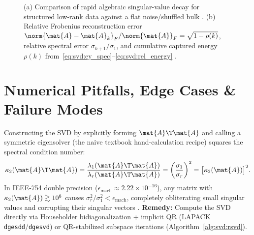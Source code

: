 \documentclass[../../../../master.tex]{subfiles}
\begin{document}
\begin{figure}[htbp]
\caption{(a) Comparison of rapid algebraic singular-value decay for structured low-rank data against a flat noise/shuffled bulk . (b) Relative Frobenius reconstruction error $\norm{\mat{A}-\mat{A}_k}_F/\norm{\mat{A}}_F = \sqrt{1-\rho(k)}$, relative spectral error $\sigma_{k+1}/\sigma_1$, and cumulative captured energy $\rho(k)$ from~\eqref{eq:svd:ey_spec}--\eqref{eq:svd:rel_energy} .}
\label{fig:svd:spectrum_error}
\end{figure}


\section{Numerical Pitfalls, Edge Cases \& Failure Modes}
\label{sec:svd:pitfalls}

\begin{pitfall}
Constructing the SVD by explicitly forming $\mat{A}\T\mat{A}$ and calling a symmetric eigensolver (the naive textbook hand-calculation recipe) squares the spectral condition number:
\[
  \kappa_2(\mat{A}\T\mat{A}) = \frac{\lambda_1(\mat{A}\T\mat{A})}{\lambda_r(\mat{A}\T\mat{A})} = \left(\frac{\sigma_1}{\sigma_r}\right)^2 = \bigl[\kappa_2(\mat{A})\bigr]^2.
\]
In IEEE-754 double precision ($\epsilon_{\text{mach}} \approx 2.22 \times 10^{-16}$), any matrix with $\kappa_2(\mat{A}) \gtrsim 10^8$ causes $\sigma_r^2/\sigma_1^2 < \epsilon_{\text{mach}}$, completely obliterating small singular values and corrupting their singular vectors  . \textbf{Remedy:} Compute the SVD directly via Householder bidiagonalization + implicit QR (LAPACK \texttt{dgesdd}/\texttt{dgesvd}) or QR-stabilized subspace iterations (Algorithm~\ref{alg:svd:rsvd}).
\end{pitfall}
\end{document}
